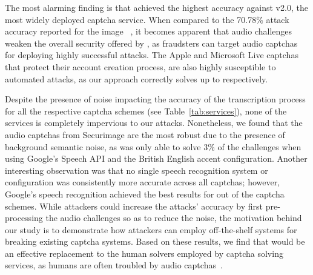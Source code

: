 The most alarming finding is 
that \system achieved the highest accuracy against \re v2.0, the most widely deployed captcha service. When compared 
to the 70.78\% attack accuracy reported for the image \re~\cite{sivakorn:eurosp16}, it becomes apparent that audio challenges
weaken the overall security offered by \re, as fraudsters can target audio captchas for deploying highly successful
attacks. The Apple and Microsoft Live captchas that protect their account creation process, are also highly susceptible to 
automated attacks, as our approach correctly solves up to  respectively.

Despite the presence of noise impacting the accuracy of the transcription process for all the respective captcha schemes
(see Table~\ref{tab:services}), none of the services is completely impervious to our attacks. Nonetheless, we
found that the audio captchas from Securimage are the most robust due to the presence of background semantic noise,
as \system was only able to solve 3\% of the challenges when using Google's Speech API and the British English accent
configuration. Another interesting observation was that no single speech recognition system or configuration
was consistently more accurate across all captchas; however, Google's speech recognition achieved the best
results for  out of the  captcha schemes. While attackers could increase the attacks' accuracy
by first pre-processing the audio challenges so as to reduce the noise, the motivation behind our study is to 
demonstrate how attackers can employ off-the-shelf systems for breaking existing captcha systems.
Based on these results, we find that \system would be an effective replacement to the human solvers employed by
captcha solving services, as humans are often troubled by audio captchas~\cite{captchas-are-hard}.


